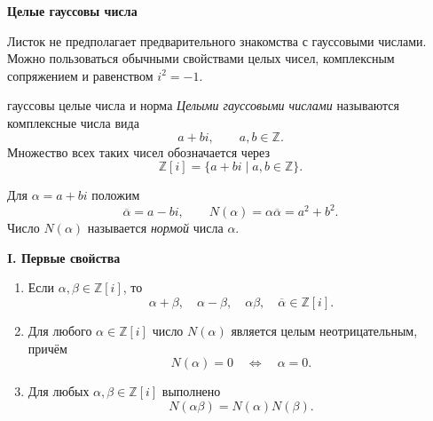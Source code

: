 
\begin{center}
    {\LARGE\bfseries Целые гауссовы числа}
\end{center}

\begin{remarkbox}
Листок не предполагает предварительного знакомства с гауссовыми
числами. Можно пользоваться обычными свойствами целых чисел,
комплексным сопряжением и равенством $i^2=-1$.
\end{remarkbox}

\begin{defbox}{гауссовы целые числа и норма}
\emph{Целыми гауссовыми числами} называются комплексные числа вида
\[
    a+bi,\qquad a,b\in\mathbb Z.
\]
Множество всех таких чисел обозначается через
\[
    \mathbb Z[i]=\{a+bi\mid a,b\in\mathbb Z\}.
\]

Для $\alpha=a+bi$ положим
\[
    \overline{\alpha}=a-bi,
    \qquad
    N(\alpha)=\alpha\overline{\alpha}=a^2+b^2.
\]
Число $N(\alpha)$ называется \emph{нормой} числа $\alpha$.
\end{defbox}

\begin{center}
    {\large\bfseries I. Первые свойства}
\end{center}


\begin{enumerate}[label=\textbf{\alph*)}, leftmargin=8mm]
    \item Если $\alpha,\beta\in\mathbb Z[i]$, то
    \[
        \alpha+\beta,\quad \alpha-\beta,\quad
        \alpha\beta,\quad \overline{\alpha}
        \in\mathbb Z[i].
    \]

    \item Для любого $\alpha\in\mathbb Z[i]$ число $N(\alpha)$ является
    целым неотрицательным, причём
    \[
        N(\alpha)=0\quad\Longleftrightarrow\quad \alpha=0.
    \]

    \item Для любых $\alpha,\beta\in\mathbb Z[i]$ выполнено
    \[
        N(\alpha\beta)=N(\alpha)N(\beta).
    \]
\end{enumerate}

